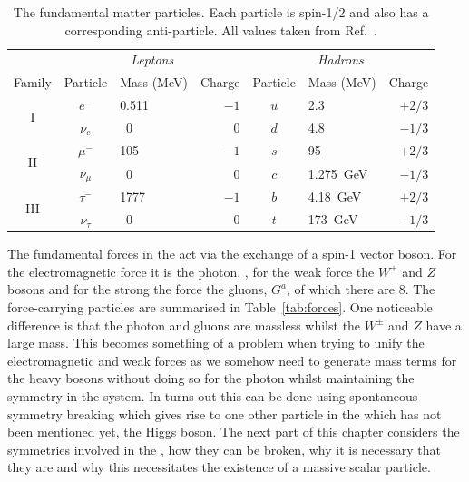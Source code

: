 \begin{table}[htb]
  \begin{tabular}{c | c l r | c l r }
  & \multicolumn{3}{c}{\textit{Leptons}} & \multicolumn{3}{c}{\textit{Hadrons}} \\
  Family & Particle      & Mass (MeV)  & Charge &  Particle      & Mass (MeV)  & Charge   \\
  \hline
  \multirow{2}{*}{I}    & $e^{-}$       & 0.511       & $-1$     &  $u$           & 2.3       & $+2/3$      \\
                        & $\nu_{e}$     & ~0          & 0      &  $d$           & 4.8         & $-1/3$       \\
  \multirow{2}{*}{II}   & $\mu^{-}$     & 105         & $-1$     &  $s$           & 95         & $+2/3$      \\
                        & $\nu_{\mu}$   & ~0          & 0      &  $c$           & 1.275~GeV          & $-1/3$       \\
  \multirow{2}{*}{III}  & $\tau^{-}$    & 1777        & $-1$     &  $b$           & 4.18~GeV        & $+2/3$      \\
                        & $\nu_{\tau}$  & ~0          & 0      &  $t$           & 173~GeV          & $-1/3$      \\
  \end{tabular}
  \caption[The fundamental matter particles]{The fundamental matter particles. Each particle is spin-1/2 and also has a corresponding anti-particle. All values taken from Ref.~\cite{pdg}.}
  \label{tab:particles}
\end{table}

The fundamental forces in the \SM act via the exchange of a spin-1 vector boson. For the electromagnetic force it is the photon, \gamma, for the weak force the $W^{\pm}$ and $Z$ bosons and for the strong the force the gluons, $G^{a}$, of which there are 8. The force-carrying particles are summarised in Table~\ref{tab:forces}. One noticeable difference is that the photon and gluons are massless whilst the $W^{\pm}$ and $Z$ have a large mass. This becomes something of a problem when trying to unify the electromagnetic and weak forces as we somehow need to generate mass terms for the heavy bosons without doing so for the photon whilst maintaining the symmetry in the system. In turns out this can be done using spontaneous symmetry breaking which gives rise to one other particle in the \SM which has not been mentioned yet, the Higgs boson. The next part of this chapter considers the symmetries involved in the \SM, how they can be broken, why it is necessary that they are and why this necessitates the existence of a massive scalar particle.

